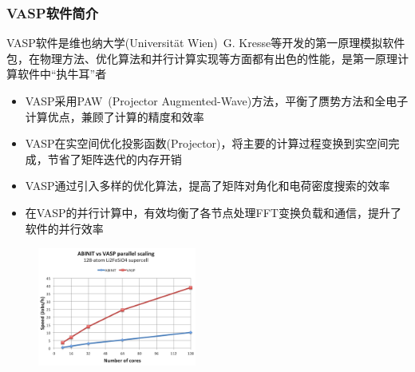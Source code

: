 \frame
{
	\frametitle{\textrm{VASP}软件简介}
	\textrm{VASP}软件是维也纳大学\textrm{(Universit\"at Wien)}~\textrm{G. Kresse}等开发的第一原理模拟软件包，在物理方法、优化算法和并行计算实现等方面都有出色的性能，是第一原理计算软件中``执牛耳''者
	\begin{itemize}
\fontsize{7.2pt}{5.2pt}\selectfont
		\item \textrm{VASP}采用\textrm{PAW~(Projector Augmented-Wave)}方法，平衡了赝势方法和全电子计算优点，兼顾了计算的精度和效率
		\item \textrm{VASP}在实空间优化投影函数\textrm{(Projector)}，将主要的计算过程变换到实空间完成，节省了矩阵迭代的内存开销%
		\item \textrm{VASP}通过引入多样的优化算法，提高了矩阵对角化和电荷密度搜索的效率
		\item 在\textrm{VASP}的并行计算中，有效均衡了各节点处理\textrm{FFT}变换负载和通信，提升了软件的并行效率
	\end{itemize}
\begin{figure}[h!]
	\vspace{-0.25in}
\centering
\includegraphics[height=1.55in,width=2.05in,viewport=0 0 240 200,clip]{Figures/VASP-abinit_Li128-2.png}
\label{ABINIT_vs_VASP-1}
\end{figure} 
}

%

